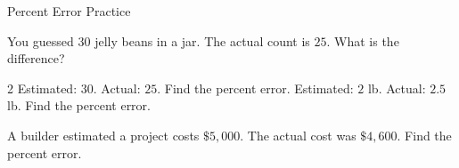 
\newpage
\begin{stepPractice}{Percent Error Practice}
    \resetProblems

    \prob You guessed $30$ jelly beans in a jar. The actual count is $25$. What is the difference? \answerBlank[2cm]

    \begin{multicols}{2}
    \prob Estimated: $30$. Actual: $25$. Find the percent error. \answerBlank[2cm]
    \prob Estimated: $2$ lb. Actual: $2.5$ lb. Find the percent error. \answerBlank[2cm]
    \end{multicols}

    \prob A builder estimated a project costs $\$5{,}000$. The actual cost was $\$4{,}600$. Find the percent error. \answerBlank[2cm]

\end{stepPractice}
